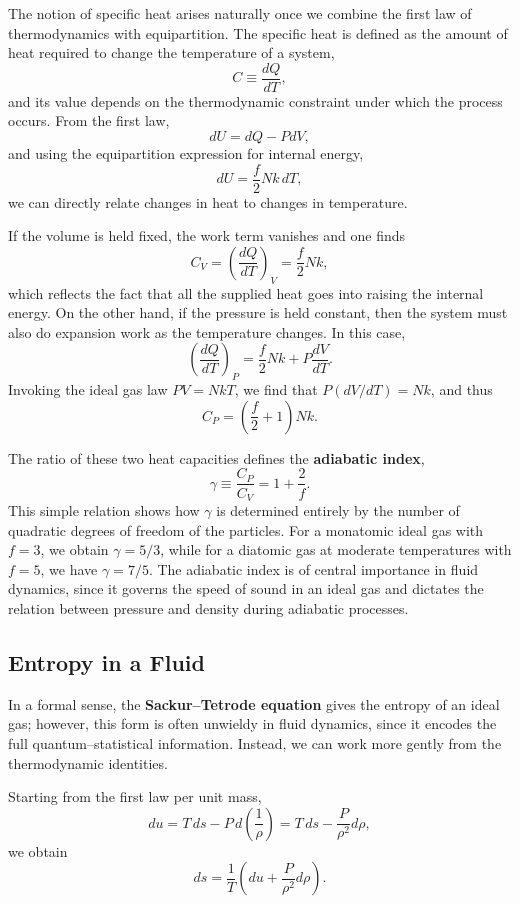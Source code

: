 The notion of specific heat arises naturally once we combine the first law of thermodynamics with equipartition. The specific heat is defined as the amount of heat required to change the temperature of a system, 
\[
C \equiv \frac{dQ}{dT},
\]
and its value depends on the thermodynamic constraint under which the process occurs. From the first law,
\[
dU = dQ - PdV,
\]
and using the equipartition expression for internal energy, 
\[
dU = \frac{f}{2} Nk \, dT,
\]
we can directly relate changes in heat to changes in temperature.  

If the volume is held fixed, the work term vanishes and one finds
\[
C_V = \left(\frac{dQ}{dT}\right)_V = \frac{f}{2} Nk,
\]
which reflects the fact that all the supplied heat goes into raising the internal energy. On the other hand, if the pressure is held constant, then the system must also do expansion work as the temperature changes. In this case,
\[
\left(\frac{dQ}{dT}\right)_P = \frac{f}{2} Nk + P \frac{dV}{dT}.
\]
Invoking the ideal gas law $PV = NkT$, we find that $P(dV/dT) = Nk$, and thus
\[
C_P = \left(\frac{f}{2} + 1\right) Nk.
\]

The ratio of these two heat capacities defines the \textbf{adiabatic index}, 
\[
\gamma \equiv \frac{C_P}{C_V} = 1 + \frac{2}{f}.
\]
This simple relation shows how $\gamma$ is determined entirely by the number of quadratic degrees of freedom of the particles. For a monatomic ideal gas with $f=3$, we obtain $\gamma = 5/3$, while for a diatomic gas at moderate temperatures with $f=5$, we have $\gamma = 7/5$. The adiabatic index is of central importance in fluid dynamics, since it governs the speed of sound in an ideal gas and dictates the relation between pressure and density during adiabatic processes.

\subsection{Entropy in a Fluid}

In a formal sense, the \textbf{Sackur–Tetrode equation} gives the entropy of an ideal gas; however, this form is often unwieldy in fluid dynamics, since it encodes the full quantum–statistical information. Instead, we can work more gently from the thermodynamic identities.

Starting from the first law per unit mass,
\[
du = T\,ds - P\,d\!\left(\frac{1}{\rho}\right) 
    = T\,ds - \frac{P}{\rho^2} d\rho,
\]
we obtain
\[
ds = \frac{1}{T}\left(du + \frac{P}{\rho^2} d\rho\right).
\]

